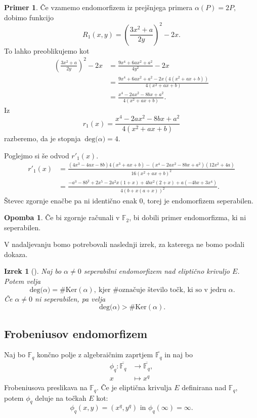 \documentclass[12pt,a4paper,twoside]{article}
\theoremstyle{definition} %
\newtheorem{primer}[definicija]{Primer}
\newtheorem{opomba}[definicija]{Opomba}
\theoremstyle{plain} %
\newtheorem{izrek}[definicija]{Izrek}
\numberwithin{equation}{section}  %
\newcommand{\F}{\mathbb F}
\newcommand{\DEG}[1]{\ \text{deg(}{#1}\text{)}}
\begin{document}
\begin{primer}
Če vzamemo endomorfizem iz prejšnjega primera $\alpha(P) = 2P,$ dobimo funkcijo
$$R_1(x,y) = \left(\frac{3x^2+a}{2y}\right)^2-2x.$$
To lahko preoblikujemo kot
\begin{align}
\left(\frac{3x^2+a}{2y}\right)^2-2x &{}= \frac{9x^4+6ax^2+a^2}{4y^2}-2x \nonumber \\
&{} = \frac{9x^4+6ax^2+a^2 - 2x(4(x^2+ax+b))}{4(x^2+ax+b)} \nonumber \\
&{} = \frac{x^4-2ax^2-8bx+a^2}{4(x^2+ax+b)}. \nonumber
\end{align}
Iz
$$r_1(x) = \frac{x^4-2ax^2-8bx+a^2}{4(x^2+ax+b)}$$
razberemo, da je stopnja $\DEG{\alpha} = 4$.

Poglejmo si še odvod $r'_1(x)$.
\begin{align}
r'_1(x) &{}=\frac{(4x^3-4ax-8b)4(x^3+ax+b)-(x^4-2ax^2-8bx+a^2)(12x^2+4a)}{16(x^2+ax+b)^2} \nonumber \\
&{} = \frac{-a^3 - 8 b^2 + 2 x^5 - 2 a^2 x (1 + x) + 4 b x^2 (2 + x) +  a (-4 b x + 3 x^4)}{4 (b + x (a + x))^2}. \nonumber
\end{align}
Števec zgornje enačbe pa ni identično enak $0$, torej je endomorfizem seperabilen.
\begin{opomba}
Če bi zgornje računali v $\F_2$, bi dobili primer endomorfizma, ki ni seperabilen.
\end{opomba}
\end{primer}

V nadaljevanju bomo potrebovali naslednji izrek, za katerega ne bomo podali dokaza.

\begin{izrek}[]
\label{izrek:2.21}
Naj bo $\alpha \neq 0$ seperabilni endomorfizem nad eliptično krivuljo $E$. Potem velja
$$\DEG{\alpha}= \# \text{Ker}(\alpha), \ \text{kjer \# označuje število točk, ki so v jedru } \alpha.$$
Če $\alpha \neq 0$ ni seperabilen, pa velja
$$\DEG{\alpha} > \# \text{Ker}(\alpha).$$
\end{izrek}

\subsection{Frobeniusov endomorfizem}

Naj bo $\F_q$ končno polje z algebraičnim zaprtjem $\overline{\F_q}$ in naj bo
\begin{align}
\phi_q:\overline{\F_q} &{} \rightarrow \overline{\F_q}, \nonumber \\
x &{} \mapsto x^q \nonumber
\end{align}
Frobeniusova preslikava na $\F_q$.
Če je eliptična krivulja $E$ definirana nad $\F_q$, potem $\phi_q$ deluje na točkah $E$ kot:
$$\phi_q(x,y) = (x^q,y^q) \text{ in } \phi_q(\infty) = \infty.$$
\end{document}
